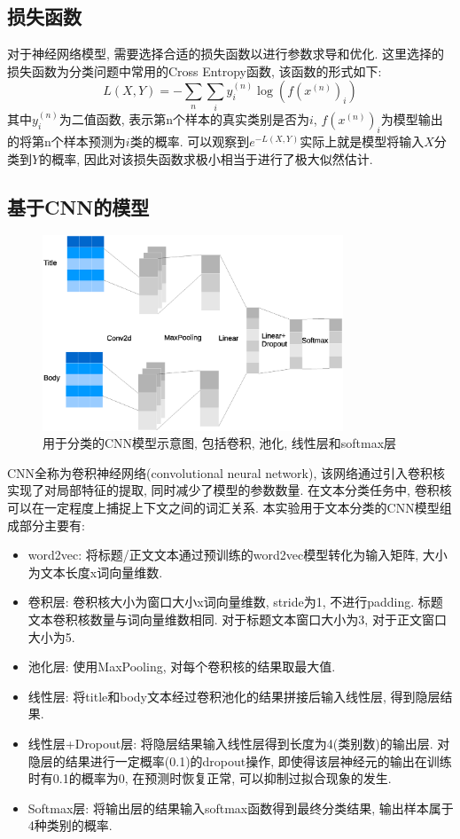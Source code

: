 \documentclass[a4paper]{article}
\begin{document}
	\subsection{损失函数}
	对于神经网络模型, 需要选择合适的损失函数以进行参数求导和优化. 这里选择的损失函数为分类问题中常用的Cross Entropy函数, 该函数的形式如下:
	\begin{equation*}
		L(X,Y)=-\sum_{n}\sum_{i}y_i^{(n)}\log{(f(x^{(n)})_i)}
	\end{equation*}
	其中$y_i^{(n)}$为二值函数, 表示第n个样本的真实类别是否为$i$, $f(x^{(n)})_i$为模型输出的将第n个样本预测为$i$类的概率. 可以观察到$e^{-L(X,Y)}$实际上就是模型将输入$X$分类到$Y$的概率, 因此对该损失函数求极小相当于进行了极大似然估计.
	\subsection{基于CNN的模型}
	\begin{figure}[H]
		\centering
		\includegraphics[width=0.8\textwidth]{cnn.eps}
		\caption{用于分类的CNN模型示意图, 包括卷积, 池化, 线性层和softmax层}
		\label{cnn}
	\end{figure}
	CNN全称为卷积神经网络(convolutional neural network), 该网络通过引入卷积核实现了对局部特征的提取, 同时减少了模型的参数数量. 在文本分类任务中, 卷积核可以在一定程度上捕捉上下文之间的词汇关系. 本实验用于文本分类的CNN模型组成部分主要有:
	\begin{itemize}
		\item word2vec: 将标题/正文文本通过预训练的word2vec模型转化为输入矩阵, 大小为文本长度x词向量维数.
		\item 卷积层: 卷积核大小为窗口大小x词向量维数, stride为1, 不进行padding. 标题文本卷积核数量与词向量维数相同. 对于标题文本窗口大小为3, 对于正文窗口大小为5.
		\item 池化层: 使用MaxPooling, 对每个卷积核的结果取最大值.
		\item 线性层: 将title和body文本经过卷积池化的结果拼接后输入线性层, 得到隐层结果.
		\item 线性层+Dropout层: 将隐层结果输入线性层得到长度为4(类别数)的输出层. 对隐层的结果进行一定概率(0.1)的dropout操作, 即使得该层神经元的输出在训练时有0.1的概率为0, 在预测时恢复正常, 可以抑制过拟合现象的发生\cite{srivastava2014dropout}.
		\item Softmax层: 将输出层的结果输入softmax函数得到最终分类结果, 输出样本属于4种类别的概率.
	\end{itemize}
\end{document}
